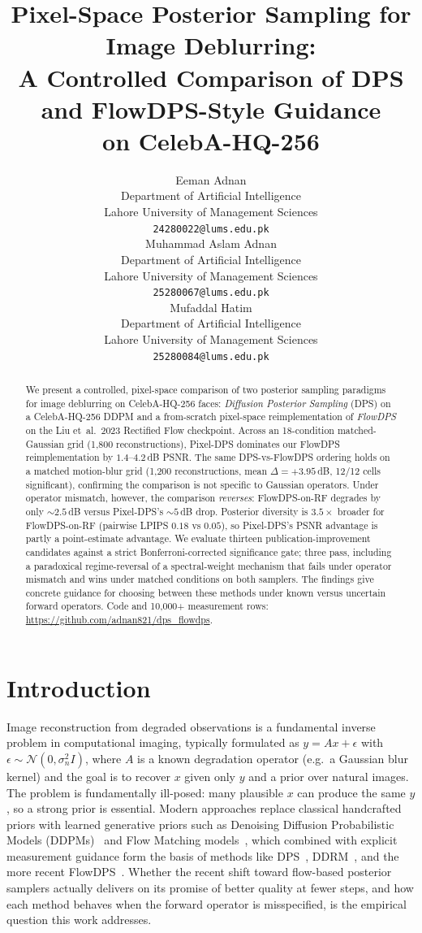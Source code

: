 \documentclass{article}
\title{Pixel-Space Posterior Sampling for Image Deblurring:\\
       A Controlled Comparison of DPS and FlowDPS-Style Guidance\\
       on CelebA-HQ-256}
\author{%
  Eeman Adnan \\
  Department of Artificial Intelligence \\
  Lahore University of Management Sciences \\
  \texttt{24280022@lums.edu.pk} \\
  \And
  Muhammad Aslam Adnan \\
  Department of Artificial Intelligence \\
  Lahore University of Management Sciences \\
  \texttt{25280067@lums.edu.pk} \\
  \And
  Mufaddal Hatim \\
  Department of Artificial Intelligence \\
  Lahore University of Management Sciences \\
  \texttt{25280084@lums.edu.pk} \\
}
\begin{document}
\maketitle

\begin{abstract}
We present a controlled, pixel-space comparison of two posterior
sampling paradigms for image deblurring on CelebA-HQ-256 faces:
\emph{Diffusion Posterior Sampling} (DPS) on a CelebA-HQ-256 DDPM
and a from-scratch pixel-space reimplementation of \emph{FlowDPS}
on the Liu et~al.\ 2023 Rectified Flow checkpoint. Across an
18-condition matched-Gaussian grid (1,800 reconstructions),
Pixel-DPS dominates our FlowDPS reimplementation by $1.4$--$4.2$\,dB
PSNR. The same DPS-vs-FlowDPS ordering holds on a matched
motion-blur grid (1,200 reconstructions, mean $\Delta{=}+3.95$\,dB,
12/12 cells significant), confirming the comparison is not specific
to Gaussian operators. Under operator mismatch, however, the
comparison \emph{reverses}: FlowDPS-on-RF degrades by only $\sim2.5$\,dB
versus Pixel-DPS's $\sim 5$\,dB drop. Posterior diversity is
$3.5\times$ broader for FlowDPS-on-RF (pairwise LPIPS $0.18$ vs
$0.05$), so Pixel-DPS's PSNR advantage is partly a point-estimate
advantage. We evaluate thirteen publication-improvement candidates
against a strict Bonferroni-corrected significance gate; three pass,
including a paradoxical regime-reversal of a spectral-weight
mechanism that fails under operator mismatch and wins under matched
conditions on both samplers. The findings give concrete guidance for
choosing between these methods under known versus uncertain forward
operators. Code and 10,000+ measurement rows:
\url{https://github.com/adnan821/dps_flowdps}.
\end{abstract}

\section{Introduction}

Image reconstruction from degraded observations is a fundamental
inverse problem in computational imaging, typically formulated as
$y = A x + \epsilon$ with $\epsilon \sim \mathcal{N}(0, \sigma_n^2 I)$,
where $A$ is a known degradation operator (e.g.\ a Gaussian blur kernel)
and the goal is to recover $x$ given only $y$ and a prior over natural
images. The problem is fundamentally ill-posed: many plausible $x$ can
produce the same $y$, so a strong prior is essential. Modern approaches
replace classical handcrafted priors with learned generative priors such
as Denoising Diffusion Probabilistic Models (DDPMs)~\citep{ho2020ddpm}
and Flow Matching models~\citep{lipman2023flow,liu2023rectified}, which
combined with explicit measurement guidance form the basis of methods
like DPS~\citep{chung2023dps}, DDRM~\citep{kawar2022ddrm}, and the more
recent FlowDPS~\citep{kim2025flowdps}. Whether the recent shift toward
flow-based posterior samplers actually delivers on its promise of better
quality at fewer steps, and how each method behaves when the forward
operator is misspecified, is the empirical question this work addresses.
\end{document}
